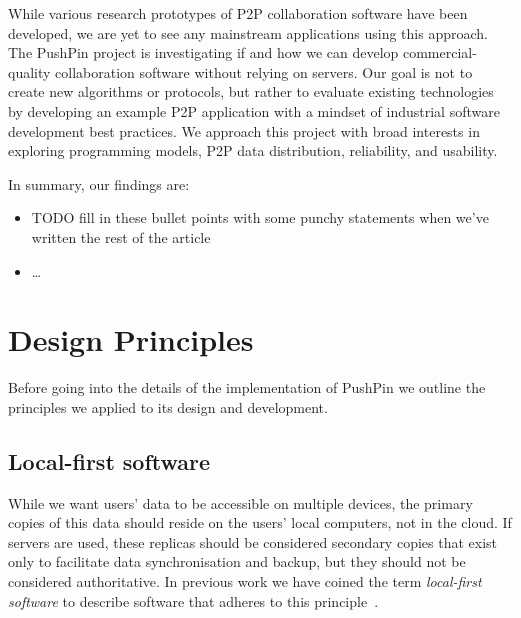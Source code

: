 \documentclass[sigplan,10pt]{acmart}
\begin{document}

While various research prototypes of P2P collaboration software have been developed, we are yet to see any mainstream applications using this approach.
The PushPin project is investigating if and how we can develop commercial-quality collaboration software without relying on servers.
Our goal is not to create new algorithms or protocols, but rather to evaluate existing technologies by developing an example P2P application with a mindset of industrial software development best practices.
We approach this project with broad interests in exploring programming models, P2P data distribution, reliability, and usability.

In summary, our findings are:
\begin{itemize}
    \item TODO fill in these bullet points with some punchy statements when we've written the rest of the article
    \item \dots
\end{itemize}




\section{Design Principles}\label{sec:principles}

Before going into the details of the implementation of PushPin we outline the principles we applied to its design and development.

\subsection{Local-first software}

While we want users' data to be accessible on multiple devices, the primary copies of this data should reside on the users' local computers, not in the cloud.
If servers are used, these replicas should be considered secondary copies that exist only to facilitate data synchronisation and backup, but they should not be considered authoritative.
In previous work we have coined the term \emph{local-first software} to describe software that adheres to this principle~\cite{LocalFirst}.
\end{document}
